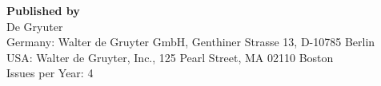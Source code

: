 {\bf Published by}	\\%
De Gryuter	\\
Germany: Walter de Gruyter GmbH, Genthiner Strasse 13, D-10785 Berlin \\
USA: Walter de Gruyter, Inc., 125 Pearl Street, MA 02110 Boston \\
Issues per Year: 4\\[19.5mm]
